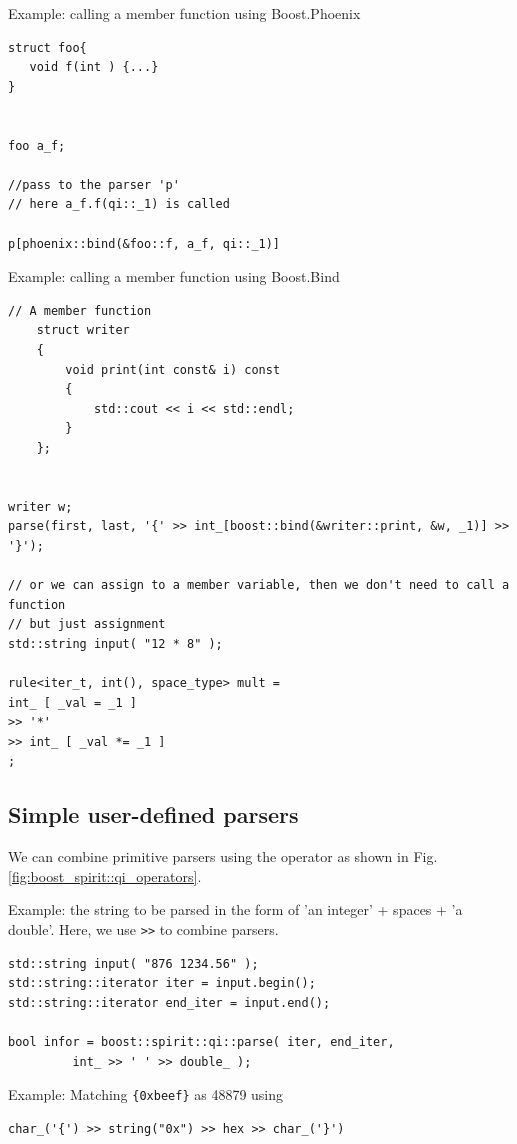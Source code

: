 Example: calling a member function using Boost.Phoenix
\begin{verbatim}
struct foo{ 
   void f(int ) {...}
}


foo a_f;

//pass to the parser 'p'
// here a_f.f(qi::_1) is called

p[phoenix::bind(&foo::f, a_f, qi::_1)]
\end{verbatim}

Example: calling a member function using Boost.Bind
\begin{verbatim}
// A member function
    struct writer
    {
        void print(int const& i) const
        {
            std::cout << i << std::endl;
        }
    };
    
    
writer w;
parse(first, last, '{' >> int_[boost::bind(&writer::print, &w, _1)] >> '}');

// or we can assign to a member variable, then we don't need to call a function
// but just assignment
std::string input( "12 * 8" );

rule<iter_t, int(), space_type> mult =
int_ [ _val = _1 ]
>> '*'
>> int_ [ _val *= _1 ]
;
\end{verbatim}

\subsection{Simple user-defined parsers}
\label{sec:boost_spirit::qi_user_defined_parser}

We can combine primitive parsers using the operator as shown in
Fig.\ref{fig:boost_spirit::qi_operators}. 

Example: the string to be parsed in the form of 'an integer' + spaces +
'a double'. Here, we use \verb!>>! to combine parsers. 
\begin{verbatim}
std::string input( "876 1234.56" );
std::string::iterator iter = input.begin();
std::string::iterator end_iter = input.end();

bool infor = boost::spirit::qi::parse( iter, end_iter,
         int_ >> ' ' >> double_ );
\end{verbatim}

Example: Matching \verb!{0xbeef}! as 48879 using
\begin{verbatim}
char_('{') >> string("0x") >> hex >> char_('}')
\end{verbatim}


